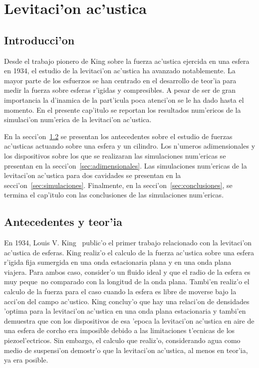 \chapter{Levitaci'on ac'ustica}

\section{Introducci'on}

Desde el trabajo pionero de King sobre la fuerza ac'ustica ejercida en una esfera en 1934, el estudio
de la levitaci'on ac'ustica ha avanzado notablemente. La mayor parte de los esfuerzos se han
centrado en el desarrollo de teor'ia para medir la fuerza sobre esferas r'igidas y compresibles. A pesar
de ser de gran importancia la d'inamica de la part'icula poca atenci'on se le ha dado hasta el 
momento. En el presente cap'itulo se reportan los resultados num'ericos de la simulaci'on
num'erica de la levitaci'on ac'ustica.


En la secci'on~\ref{sec:antecedentes} se presentan los antecedentes sobre el estudio de fuerzas
ac'usticas actuando sobre una esfera y un cilindro. Los n'umeros adimensionales y los dispositivos
sobre los que se realizaran las simulaciones num'ericas se presentan en la secci'on~\ref{sec:adimensionales}.
Las simulaciones num'ericas de la levitaci'on ac'ustica para dos cavidades se presentan en
la secci'on~\ref{sec:simulaciones}. Finalmente, en la secci'on~\ref{sec:conclusiones}, 
se termina el cap'itulo con las conclusiones de las simulaciones num'ericas.

\section{Antecedentes y teor'ia}
\label{sec:antecedentes}


En 1934, Louis V. King~\cite{king34} public'o el primer trabajo relacionado con la levitaci'on ac'ustica de
esferas. King realiz'o el calculo de la fuerza ac'ustica sobre una esfera r'igida fija sumergida en una
onda estacionaria plana y en una onda plana viajera. Para ambos caso, consider'o un fluido ideal y que el
radio de la esfera es muy peque~no comparado con la longitud de la onda plana. Tambi'en realiz'o el calculo
de la fuerza para el caso cuando la esfera es libre de moverse bajo la acci'on del campo ac'ustico. 
King concluy'o que hay una relaci'on de densidades 'optima para la levitaci'on ac'ustica en una onda plana
estacionaria y tambi'en demuestra que con los dispositivos de esa 'epoca la levitaci'on ac'ustica en aire de una 
esfera de corcho era imposible debido a las limitaciones t'ecnicas de los piezoel'ectricos. Sin embargo,
el calculo que realiz'o, considerando agua como medio de suspensi'on demostr'o que la levitaci'on ac'ustica,
al menos en teor'ia, ya era posible.

